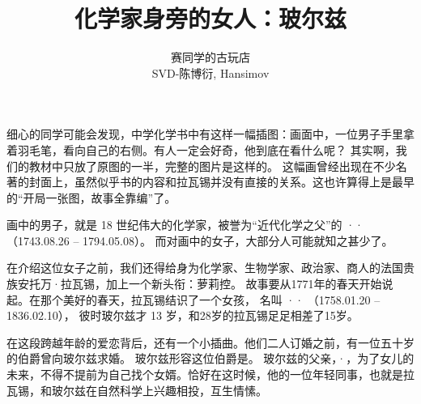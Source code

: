 \documentclass[a4paper]{article}
\title{化学家身旁的女人：玻尔兹}
\author{赛同学的古玩店 \\ SVD-陈博衍, Hansimov}
\begin{document}
\maketitle

细心的同学可能会发现，中学化学书中有这样一幅插图：画面中，一位男子手里拿着羽毛笔，看向自己的右侧。有人一定会好奇，他到底在看什么呢？
其实啊，我们的教材中只放了原图的一半，完整的图片是这样的。
这幅画曾经出现在不少名著的封面上，虽然似乎书的内容和拉瓦锡并没有直接的关系。这也许算得上是最早的“开局一张图，故事全靠编”了。


画中的男子，就是 18 世纪伟大的化学家，被誉为“近代化学之父”的
\os{}{-}··
（1743.08.26 – 1794.05.08）。
而对画中的女子，大部分人可能就知之甚少了。

在介绍这位女子之前，我们还得给身为化学家、生物学家、政治家、商人的法国贵族安托万·拉瓦锡，加上一个新头衔：萝莉控。
故事要从1771年的春天开始说起。在那个美好的春天，拉瓦锡结识了一个女孩，
名叫 \os{}{-}··
（1758.01.20 – 1836.02.10），
彼时玻尔兹才 13 岁，和28岁的拉瓦锡足足相差了15岁。

在这段跨越年龄的爱恋背后，还有一个小插曲。他们二人订婚之前，有一位五十岁的伯爵曾向玻尔兹求婚。
玻尔兹形容这位伯爵是。
玻尔兹的父亲，·，为了女儿的未来，不得不提前为自己找个女婿。恰好在这时候，他的一位年轻同事，也就是拉瓦锡，和玻尔兹在自然科学上兴趣相投，互生情愫。
\end{document}
